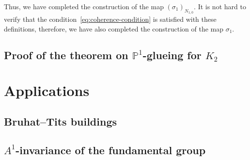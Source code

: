 \documentclass[oneside, 10pt]{amsart}
\numberwithin{equation}{section}
\numberwithin{lemma}{section}
\theoremstyle{definition}
\theoremstyle{remark}
\begin{document}
Thus, we have completed the construction of the map $(\sigma_1)_{N_{1,0}}$.
It is not hard to verify that the condition~\eqref{eq:coherence-condition} is satisfied with these definitions,
 therefore, we have also completed the construction of the map $\sigma_1$.

\subsection{Proof of the theorem on \texorpdfstring{$\mathbb{P}^1$}{P1}-glueing for $K_2$}

\section{Applications}

\subsection{Bruhat--Tits buildings}

\subsection{\texorpdfstring{$A^1$}{A1}-invariance of the fundamental group}

\DeclareRobustCommand{\VAN}[2]{#2}
\printbibliography
\end{document}
